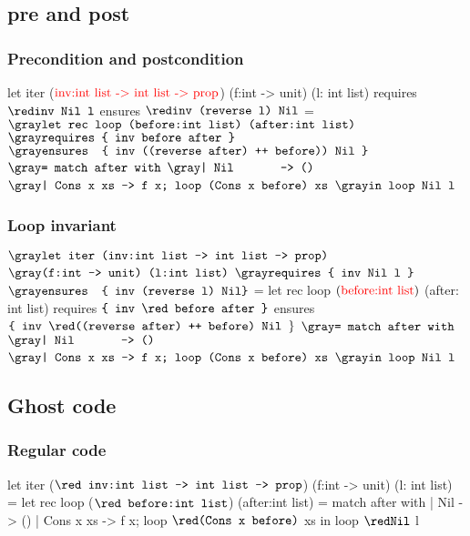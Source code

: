 \documentclass[xcolor=dvipsnames]{beamer}
\begin{document}
\subsection*{pre and post}
\begin{frame}[fragile]
\frametitle{Precondition and postcondition}
\hspace*{-4em}
\begin{footnotesize}
\begin{whycode}
let iter ($\textcolor{red}{\text{inv:int list -> int list -> prop}}$) 
(f:int -> unit) (l: int list)
requires { ${\red \texttt{inv Nil l}}$ }
ensures  { ${\red \texttt{inv (reverse l) Nil}}$ } 
= ${\gray\texttt{let rec loop (before:int list) (after:int list)}}$
  ${\gray\texttt{requires \{ inv before after \} }}$
  ${\gray\texttt{ensures~ \{ inv ((reverse after) ++ before)) Nil \}}}$  
  ${\gray\texttt{= match after with}}$
     ${\gray\texttt{| Nil~~~~~~ -> ()}}$
     ${\gray\texttt{| Cons x xs -> f x; loop (Cons x before) xs}}$
  ${\gray\texttt{in loop Nil l }}$
\end{whycode}
\end{footnotesize}
\end{frame}
\addtocounter{framenumber}{-1}

\begin{frame}[fragile]
\frametitle{Loop invariant}
\hspace*{-1em}
\begin{footnotesize}
\begin{whycode}
${\gray\texttt{let iter (inv:int list -> int list -> prop)}}$
${\gray\texttt{(f:int -> unit) (l:int list)}}$
${\gray\texttt{requires \{ inv Nil l \}}}$
${\gray\texttt{ensures~ \{ inv (reverse l) Nil\}}}$    
= let rec loop $(\textcolor{red}{\text{before:int list}})$ (after: int list) 
  requires $\texttt{\{ inv {\red before after} \}}$
  ensures  $\texttt{\{ inv {\red((reverse after) ++ before) Nil }}\}$  
  ${\gray\texttt{= match after with}}$
     ${\gray\texttt{| Nil~~~~~~ -> ()}}$
     ${\gray\texttt{| Cons x xs -> f x; loop (Cons x before) xs}}$
  ${\gray\texttt{in loop Nil l }}$
\end{whycode}
\end{footnotesize}
\end{frame}
\addtocounter{framenumber}{-1}


\subsection*{Ghost code}
\begin{frame}[fragile]
\frametitle{Regular code}
\hspace*{-1em}
\begin{whycode}
let iter (${\texttt{{\red inv}:int list -> int list -> prop}}$) 
(f:int -> unit) (l: int list)
= let rec loop (${\texttt{{\red before}:int list}}$) (after:int list)
  = match after with
     | Nil       -> ()
     | Cons x xs -> f x; loop ${\red \texttt{(Cons x before)}}$ xs
  in loop ${\red\texttt{Nil}}$ l
\end{whycode}
\end{frame}
\addtocounter{framenumber}{-1}
\end{document}

